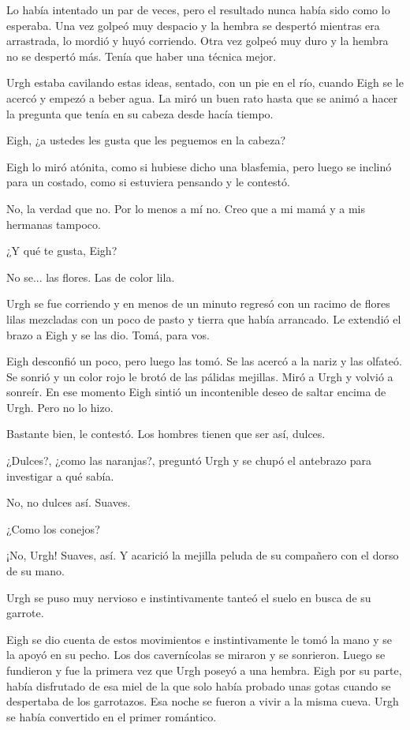 \documentclass[11pt,twoside,openright,a6paper]{book}
\begin{document}
Lo había intentado un par de veces, pero el resultado nunca había sido como lo esperaba. Una vez golpeó muy despacio y la hembra se despertó mientras era arrastrada, lo mordió y huyó corriendo. Otra vez golpeó muy duro y la hembra no se despertó más. Tenía que haber una técnica mejor.

Urgh estaba cavilando estas ideas, sentado, con un pie en el río, cuando Eigh se le acercó y empezó a beber agua. La miró un buen rato hasta que se animó a hacer la pregunta que tenía en su cabeza desde hacía tiempo.

Eigh, ¿a ustedes les gusta que les peguemos en la cabeza?

Eigh lo miró atónita, como si hubiese dicho una blasfemia, pero luego se inclinó para un costado, como si estuviera pensando y le contestó.

No, la verdad que no. Por lo menos a mí no. Creo que a mi mamá y a mis hermanas tampoco.

¿Y qué te gusta, Eigh?

No se... las flores. Las de color lila.

Urgh se fue corriendo y en menos de un minuto regresó con un racimo de flores lilas mezcladas con un poco de pasto y tierra que había arrancado. Le extendió el brazo a Eigh y se las dio. Tomá, para vos.

Eigh desconfió un poco, pero luego las tomó. Se las acercó a la nariz y las olfateó. Se sonrió y un color rojo le brotó de las pálidas mejillas. Miró a Urgh y volvió a sonreír. En ese momento Eigh sintió un incontenible deseo de saltar encima de Urgh. Pero no lo hizo.

Bastante bien, le contestó. Los hombres tienen que ser así, dulces.

¿Dulces?, ¿como las naranjas?, preguntó Urgh y se chupó el antebrazo para investigar a qué sabía.

No, no dulces así. Suaves.

¿Como los conejos?

¡No, Urgh! Suaves, así. Y acarició la mejilla peluda de su compañero con el dorso de su mano.

Urgh se puso muy nervioso e instintivamente tanteó el suelo en busca de su garrote.

Eigh se dio cuenta de estos movimientos e instintivamente le tomó la mano y se la apoyó en su pecho. Los dos cavernícolas se miraron y se sonrieron. Luego se fundieron y fue la primera vez que Urgh poseyó a una hembra. Eigh por su parte, había disfrutado de esa miel de la que solo había probado unas gotas cuando se despertaba de los garrotazos. Esa noche se fueron a vivir a la misma cueva. Urgh se había convertido en el primer romántico.
\end{document}

